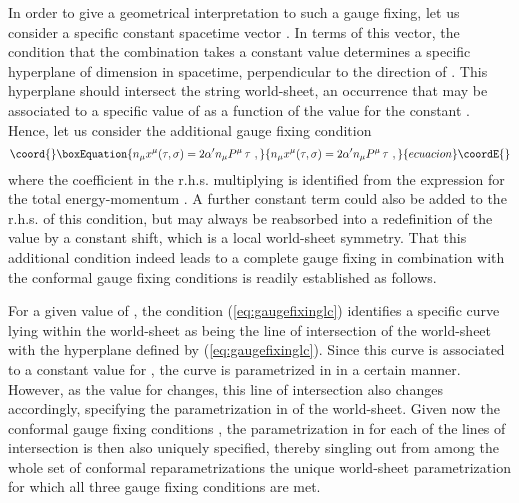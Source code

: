 \documentclass[a4paper,11pt]{article}
\begin{document}
In order to give a geometrical interpretation to such a gauge fixing,
let us consider a specific constant spacetime vector \coordHE{}. In terms
of this vector, the condition that the combination \coordHE{} takes
a constant value determines a specific hyperplane of dimension \coordHE{}
in spacetime, perpendicular to the direction of \coordHE{}. This hyperplane
should intersect the string world-sheet, an occurrence that may be associated
to a specific value of \myHighlight{$\tau$}\coordHE{} as a function of the value for the constant
\coordHE{}. Hence, let us consider the additional gauge fixing condition
\begin{equation}\coord{}\boxEquation{
n_\mu x^\mu(\tau,\sigma)=2\alpha' n_\mu P^\mu\,\tau\ ,
\label{eq:gaugefixinglc}
}{
n_\mu x^\mu(\tau,\sigma)=2\alpha' n_\mu P^\mu\,\tau\ ,
}{ecuacion}\coordE{}\end{equation}
where the coefficient in the r.h.s. multiplying \myHighlight{$\tau$}\coordHE{} is identified
from the expression for the total energy-momentum \coordHE{}.
A further constant term \coordHE{} could also be added
to the r.h.s. of this condition, but may always be reabsorbed into
a redefinition of the value \coordHE{} by a constant shift, which is
a local world-sheet symmetry. That this additional condition indeed leads
to a complete gauge fixing in combination with the conformal gauge fixing
conditions is readily established as follows.

For a given value of \myHighlight{$\tau$}\coordHE{}, the condition (\ref{eq:gaugefixinglc})
identifies a specific curve lying within the world-sheet as being the
line of intersection of the world-sheet with the hyperplane defined
by (\ref{eq:gaugefixinglc}). Since this curve is associated to a constant
value for \myHighlight{$\tau$}\coordHE{}, the curve is parametrized in \myHighlight{$\sigma$}\coordHE{} in a certain manner. 
However, as the value for \myHighlight{$\tau$}\coordHE{} changes, this line of intersection also 
changes accordingly, specifying the parametrization in \myHighlight{$\tau$}\coordHE{} of the 
world-sheet. Given now the conformal gauge fixing conditions 
\coordHE{}, the parametrization in \myHighlight{$\sigma$}\coordHE{} for each of the lines
of intersection is then also uniquely specified, thereby singling out from
among the whole set of conformal reparametrizations 
\myHighlight{$(\tilde{\tau},\tilde{\sigma})$}\coordHE{} the unique world-sheet parametrization
for which all three gauge fixing conditions are met.
\end{document}

